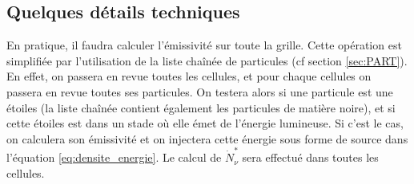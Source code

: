 

\subsection{Quelques détails techniques}

En pratique, il faudra calculer l'émissivité sur toute la grille.
Cette opération est simplifiée par l'utilisation de la liste chaînée de particules (cf section \ref{sec:PART}).
En effet, on passera en revue toutes les cellules, et pour chaque cellules on passera en revue toutes ses particules.
On testera alors si une particule est une étoiles (la liste chaînée contient également les particules de matière noire), et si cette étoiles est dans un stade où elle émet de l'énergie lumineuse.
Si c'est le cas, on calculera son émissivité et on injectera cette énergie sous forme de source dans l'équation \ref{eq:densite_energie}.
Le calcul de $\dot{N}_\nu^*$ sera effectué dans toutes les cellules.








%
